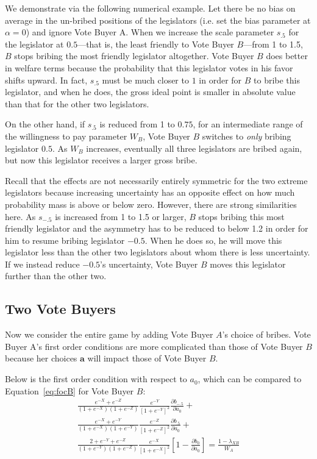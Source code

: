\documentclass[12pt]{article}
\newcommand{\al}{\alpha}
\begin{document}
We demonstrate via the following numerical example. Let there be no bias on average in the un-bribed positions of the legislators (i.e. set the bias parameter at $\al=0$) and ignore Vote Buyer A. When we increase the scale parameter $s_{.5}$ for the legislator at $0.5$---that is, the least friendly to Vote Buyer $B$---from 1 to 1.5, $B$ stops bribing the most friendly legislator altogether. Vote Buyer $B$ does better in welfare terms because the probability that this legislator votes in his favor shifts upward. In fact, $s_{.5}$ must be much closer to $1$ in order for $B$ to bribe this legislator, and when he does, the gross ideal point is smaller in absolute value than that for the other two legislators.

On the other hand, if $s_{.5}$ is reduced from 1 to $0.75$, for an intermediate range of the willingness to pay parameter $W_B$, Vote Buyer $B$ switches to \textit{only} bribing legislator $0.5$. As $W_B$ increases, eventually all three legislators are bribed again, but now this legislator receives a larger gross bribe.

Recall that the effects are not necessarily entirely symmetric for the two extreme legislators because increasing uncertainty has an opposite effect on how much probability mass is above or below zero. However, there are strong similarities here. As $s_{-.5}$ is increased from 1 to 1.5 or larger, $B$ stops bribing this most friendly legislator and the asymmetry has to be reduced to below 1.2 in order for him to resume bribing legislator $-0.5$. When he does so, he will move this legislator less than the other two legislators about whom there is less uncertainty. If we instead reduce $-0.5$'s uncertainty, Vote Buyer $B$ moves this legislator further than the other two.
		
		
\subsection{Two Vote Buyers}
\label{sec:two}
Now we consider the entire game by adding Vote Buyer $A$'s choice of bribes. Vote Buyer A's first order conditions are more complicated than those of Vote Buyer $B$ because her choices $\bm a$ will impact those of Vote Buyer $B$.

Below is the first order condition with respect to $a_0$, which can be compared to Equation~\ref{eq:focB} for Vote Buyer $B$:
			 \begin{multline}
					 \frac{e^{-X} + e^{-Z}}{\left(1+e^{-X}\right)\left(1+e^{-Z}\right)} \frac{e^{-Y}}{\left[1+e^{-Y}\right]^2} \frac{\partial b_{-.5}}{\partial a_0} + \\ 
					\frac{e^{-X} + e^{-Y}}{\left(1+e^{-X}\right)\left(1+e^{-Y}\right)} \frac{e^{-Z}}{\left[1+e^{-Z}\right]^2}\frac{\partial b_{.5}}{\partial a_0} + \\
					\frac{2+e^{-Y} + e^{-Z}}{\left(1+e^{-Y}\right)\left(1+e^{-Z}\right)} \frac{e^{-X}}{\left[1+e^{-X}\right]^2}\left[1 - \frac{\partial b_0}{\partial a_0} \right] = \frac{1 - \lambda_{XB}}{W_A}
					\label{eq:focA}
				\end{multline}
\end{document}
